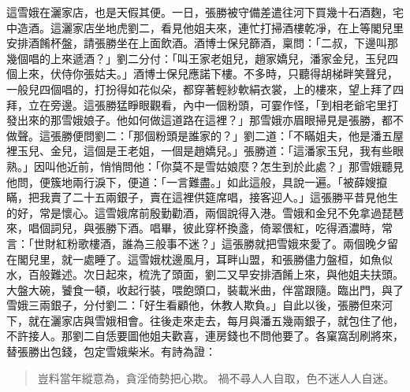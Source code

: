 這雪娥在灑家店，也是天假其便。一日，張勝被守備差遣往河下買幾十石酒麴，宅中造酒。這灑家店坐地虎劉二，看見他姐夫來，連忙打掃酒樓乾凈，在上等閣兒里安排酒餚杯盤，請張勝坐在上面飲酒。酒博士保兒篩酒，稟問：「二叔，下邊叫那幾個唱的上來遞酒？」劉二分付：「叫王家老姐兒，趙家嬌兒，潘家金兒，玉兒四個上來，伏侍你張姑夫。」酒博士保兒應諾下樓。不多時，只聽得胡梯畔笑聲兒，一般兒四個唱的，打扮得如花似朵，都穿著輕紗軟絹衣裳，上的樓來，望上拜了四拜，立在旁邊。這張勝猛睜眼觀看，內中一個粉頭，可霎作怪，「到相老爺宅里打發出來的那雪娥娘子。他如何做這道路在這裡？」那雪娥亦眉眼掃見是張勝，都不做聲。這張勝便問劉二：「那個粉頭是誰家的？」劉二道：「不瞞姐夫，他是潘五屋裡玉兒、金兒，這個是王老姐，一個是趙嬌兒。」張勝道：「這潘家玉兒，我有些眼熟。」因叫他近前，悄悄問他：「你莫不是雪姑娘麼？怎生到於此處？」那雪娥聽見他問，便簇地兩行淚下，便道：「一言難盡。」如此這般，具說一遍。「被薛嫂攛瞞，把我賣了二十五兩銀子，賣在這裡供筵席唱，接客迎人。」這張勝平昔見他生的好，常是懷心。這雪娥席前殷勤勸酒，兩個說得入港。雪娥和金兒不免拿過琵琶來，唱個詞兒，與張勝下酒。唱畢，彼此穿杯換盞，倚翠偎紅，吃得酒濃時，常言：「世財紅粉歌樓酒，誰為三般事不迷？」這張勝就把雪娥來愛了。兩個晚夕留在閣兒里，就一處睡了。這雪娥枕邊風月，耳畔山盟，和張勝儘力盤桓，如魚似水，百般難述。次日起來，梳洗了頭面，劉二又早安排酒餚上來，與他姐夫扶頭。大盤大碗，饕食一頓，收起行裝，喂飽頭口，裝載米曲，伴當跟隨。臨出門，與了雪娥三兩銀子，分付劉二：「好生看顧他，休教人欺負。」自此以後，張勝但來河下，就在灑家店與雪娥相會。往後走來走去，每月與潘五幾兩銀子，就包住了他，不許接人。那劉二自恁要圖他姐夫歡喜，連房錢也不問他要了。各窠窩刮刷將來，替張勝出包錢，包定雪娥柴米。有詩為證：
\begin{quote}
豈料當年縱意為，貪淫倚勢把心欺。
禍不尋人人自取，色不迷人人自迷。
\end{quote}
